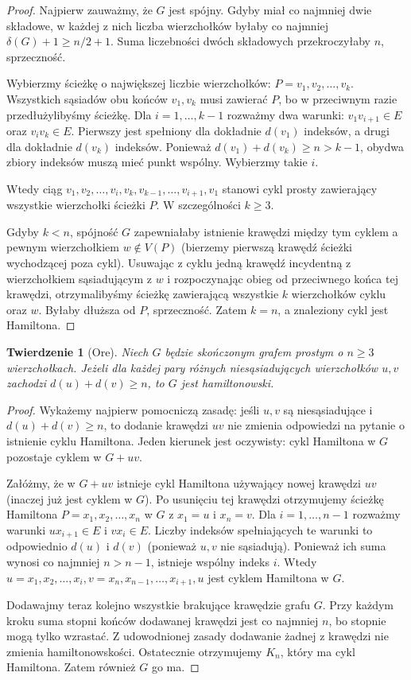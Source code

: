 \documentclass[11pt,a4paper]{report}
\numberwithin{equation}{section}
\theoremstyle{plain}
\newtheorem{twierdzenie}{Twierdzenie}[section]
\theoremstyle{definition}
\theoremstyle{remark}
\begin{document}
\begin{proof}
Najpierw zauważmy, że $G$ jest spójny.
Gdyby miał co najmniej dwie składowe, w każdej
z nich liczba wierzchołków byłaby co najmniej
$\delta(G)+1\ge n/2+1$. Suma liczebności dwóch
składowych przekroczyłaby $n$, sprzeczność.

Wybierzmy ścieżkę o największej liczbie wierzchołków:
$P=v_1,v_2,\ldots,v_k$. Wszystkich sąsiadów obu
końców $v_1,v_k$ musi zawierać $P$, bo w przeciwnym
razie przedłużylibyśmy ścieżkę.
Dla $i=1,\ldots,k-1$ rozważmy dwa warunki:
$v_1v_{i+1}\in E$ oraz $v_iv_k\in E$.
Pierwszy jest spełniony dla dokładnie $d(v_1)$ indeksów,
a drugi dla dokładnie $d(v_k)$ indeksów.
Ponieważ $d(v_1)+d(v_k)\ge n>k-1$, obydwa
zbiory indeksów muszą mieć punkt wspólny.
Wybierzmy takie $i$.

Wtedy ciąg
$v_1,v_2,\ldots,v_i,v_k,v_{k-1},\ldots,v_{i+1},v_1$
stanowi cykl prosty zawierający wszystkie wierzchołki
ścieżki $P$. W szczególności $k\ge3$.

Gdyby $k<n$, spójność $G$ zapewniałaby istnienie
krawędzi między tym cyklem a pewnym wierzchołkiem
$w\notin V(P)$ (bierzemy pierwszą krawędź ścieżki
wychodzącej poza cykl). Usuwając z cyklu jedną
krawędź incydentną z wierzchołkiem sąsiadującym
z $w$ i rozpoczynając obieg od przeciwnego końca
tej krawędzi, otrzymalibyśmy ścieżkę zawierającą
wszystkie $k$ wierzchołków cyklu oraz $w$.
Byłaby dłuższa od $P$, sprzeczność.
Zatem $k=n$, a znaleziony cykl jest Hamiltona.
\end{proof}

\begin{twierdzenie}[Ore]
\label{thm:tg-ore}
Niech $G$ będzie skończonym grafem prostym o
$n\ge3$ wierzchołkach. Jeżeli dla każdej pary
różnych niesąsiadujących wierzchołków $u,v$
zachodzi $d(u)+d(v)\ge n$, to $G$ jest hamiltonowski.
\end{twierdzenie}

\begin{proof}
Wykażemy najpierw pomocniczą zasadę: jeśli $u,v$
są niesąsiadujące i $d(u)+d(v)\ge n$, to
dodanie krawędzi $uv$ nie zmienia odpowiedzi
na pytanie o istnienie cyklu Hamiltona.
Jeden kierunek jest oczywisty: cykl Hamiltona
w $G$ pozostaje cyklem w $G+uv$.

Załóżmy, że w $G+uv$ istnieje cykl Hamiltona
używający nowej krawędzi $uv$ (inaczej już jest
cyklem w $G$). Po usunięciu tej krawędzi otrzymujemy
ścieżkę Hamiltona $P=x_1,x_2,\ldots,x_n$ w $G$
z $x_1=u$ i $x_n=v$. Dla $i=1,\ldots,n-1$
rozważmy warunki $ux_{i+1}\in E$ i $vx_i\in E$.
Liczby indeksów spełniających te warunki to
odpowiednio $d(u)$ i $d(v)$ (ponieważ $u,v$
nie sąsiadują). Ponieważ ich suma wynosi co
najmniej $n>n-1$, istnieje wspólny indeks $i$.
Wtedy
$u=x_1,x_2,\ldots,x_i,v=x_n,x_{n-1},\ldots,x_{i+1},u$
jest cyklem Hamiltona w $G$.

Dodawajmy teraz kolejno wszystkie brakujące
krawędzie grafu $G$. Przy każdym kroku suma stopni
końców dodawanej krawędzi jest co najmniej $n$,
bo stopnie mogą tylko wzrastać. Z udowodnionej
zasady dodawanie żadnej z krawędzi nie zmienia
hamiltonowskości. Ostatecznie otrzymujemy $K_n$,
który ma cykl Hamiltona. Zatem również $G$ go ma.
\end{proof}
\end{document}
